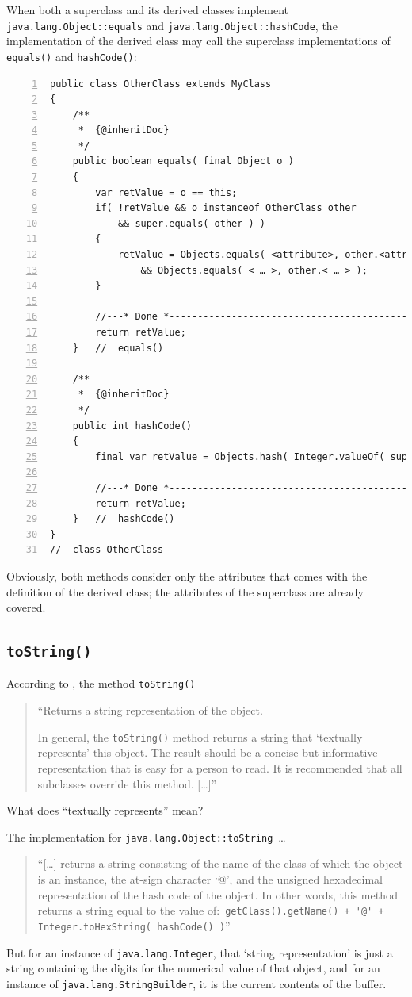 \documentclass[11pt,a4paper, titlepage, parskip=half, headsepline, footsepline, cleardoublepage=current, headheight=1cm]{scrbook}
\begin{document}
When both a superclass and its derived classes implement \lstinline|java.lang.Object::equals| and \lstinline|java.lang.Object::hashCode|, the implementation of the derived class may call the superclass implementations of \lstinline|equals()| and \lstinline|hashCode()|:
\begin{lstlisting}[numbers=left]
public class OtherClass extends MyClass
{
    /**
     *  {@inheritDoc}
     */
    public boolean equals( final Object o )
    {
        var retValue = o == this;
        if( !retValue && o instanceof OtherClass other
            && super.equals( other ) )
        {
            retValue = Objects.equals( <attribute>, other.<attribute> )
                && Objects.equals( < … >, other.< … > );
        }
            
        //---* Done *------------------------------------------------
        return retValue;
    }   //  equals()
    
    /**
     *  {@inheritDoc}
     */
    public int hashCode()
    {
        final var retValue = Objects.hash( Integer.valueOf( super.hashCode ), <attribute>, < … > );
        
        //---* Done *------------------------------------------------
        return retValue;
    }   //  hashCode()    
}
//  class OtherClass
\end{lstlisting}
Obviously, both methods consider only the attributes that comes with the definition of the derived class; the attributes of the superclass are already covered.

\subsection{\lstinline|toString()|}\label{sec:ToString}
According to \autocite{ORACLE_DOC_OBJECT:toString}, the method \lstinline|toString()|
\begin{quotation}
“Returns a string representation of the object.

In general, the \lstinline|toString()| method returns a string that ‘textually represents’ this object. The result should be a concise but informative representation that is easy for a person to read. It is recommended that all subclasses override this method. […]”
\end{quotation}

What does “textually represents” mean?

The implementation for \lstinline|java.lang.Object::toString|~…
\begin{quotation}
“[…] returns a string consisting of the name of the class of which the object is an instance, the at-sign character ‘@’, and the unsigned hexadecimal representation of the hash code of the object. In other words, this method returns a string equal to the value of:\
\lstinline|getClass().getName() + '@' + Integer.toHexString( hashCode() )|”
\end{quotation}
But for an instance of \lstinline|java.lang.Integer|\autocite{ORACLE_DOC_INTEGER_CLASS}, that ‘string representation’ is just a string containing the digits for the numerical value of that object, and for an instance of \lstinline|java.lang.StringBuilder|\autocite{ORACLE_DOC_STRINGBUILDER_CLASS}, it is the current contents of the buffer.
\end{document}

